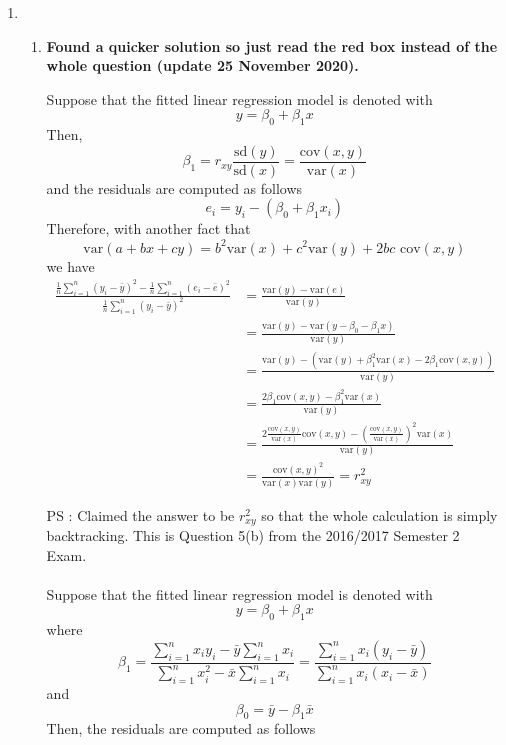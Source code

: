 \documentclass{article}
\begin{document}
\begin{enumerate}
    \item 
    \begin{enumerate}
        \item \textbf{Found a quicker solution so just read the red box instead of the whole question (update 25 November 2020).}\\
        \begin{tcolorbox}[colback=red!10, colframe=red]
        Suppose that the fitted linear regression model is denoted with \[y=\beta_0+\beta_1x\]
        Then, \[\beta_1=r_{xy}\frac{\text{sd}(y)}{\text{sd}(x)}=\frac{\text{cov}(x,y)}{\text{var}(x)}\]
        and the residuals are computed as follows
        \[e_i=y_i-(\beta_0+\beta_1x_i)\]
        Therefore, with another fact that
        \[\text{var}(a+bx+cy)=b^2\text{var}(x)+c^2\text{var}(y)+2bc\text{ cov}(x,y)\]
        we have
        \begin{align*}
            \frac{\frac{1}{n}\sum_{i=1}^{n}(y_i-\bar{y})^2-\frac{1}{n}\sum_{i=1}^{n}(e_i-\bar{e})^2}{\frac{1}{n}\sum_{i=1}^{n}(y_i-\bar{y})^2} &= \frac{\text{var}(y)-\text{var}(e)}{\text{var}(y)}\\
            &= \frac{\text{var}(y)-\text{var}(y-\beta_0-\beta_1x)}{\text{var}(y)}\\
            &= \frac{\text{var}(y)-(\text{var}(y)+\beta_1^2\text{var}(x)-2\beta_1\text{cov}(x,y))}{\text{var}(y)}\\
            &= \frac{2\beta_1\text{cov}(x,y)-\beta_1^2\text{var}(x)}{\text{var}(y)}\\
            &=\frac{2\frac{\text{cov}(x,y)}{\text{var}(x)}\text{cov}(x,y)-(\frac{\text{cov}(x,y)}{\text{var}(x)})^2\text{var}(x)}{\text{var}(y)}\\
            &=\frac{\text{cov}(x,y)^2}{\text{var}(x)\text{var}(y)}=r_{xy}^2
        \end{align*}
        \end{tcolorbox}
        PS : Claimed the answer to be $r_{xy}^2$ so that the whole calculation is simply backtracking. This is Question 5(b) from the 2016/2017 Semester 2 Exam.\\\\
        Suppose that the fitted linear regression model is denoted with \[y=\beta_0+\beta_1x\]
        where
        \[\beta_1=\frac{\sum_{i=1}^{n}x_iy_i-\bar{y}\sum_{i=1}^{n}x_i}{\sum_{i=1}^{n}x_i^2-\bar{x}\sum_{i=1}^{n}x_i}=\frac{\sum_{i=1}^{n}x_i(y_i-\bar{y})}{\sum_{i=1}^{n}x_i(x_i-\bar{x})}\]
        and
        \[\beta_0=\bar{y}-\beta_1\bar{x}\]
        Then, the residuals are computed as follows

\end{enumerate}
\end{enumerate}
\end{document}
